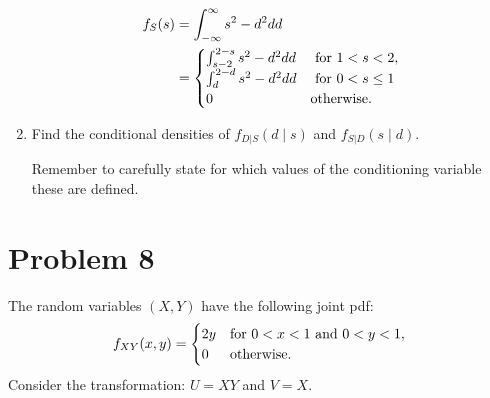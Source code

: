 \documentclass{article}
\newcommand{\1}{\mathbf{1}}
\begin{document}
\begin{enumerate}
    \begin{align*}
    f_{S}(s) &= \int_{-\infty}^\infty s^2 - d^2 dd \\
    &= \begin{cases}
       \int_{s-2}^{2-s} s^2 - d^2 dd &\hbox{ for } 1 < s < 2, \\
       \int_{d}^{2-d} s^2 - d^2 dd  &\hbox{ for } 0 < s\leq 1 \\
       0 &\hbox{otherwise.}
       \end{cases}
    \end{align*}
    
    
    \item Find the conditional densities of $f_{D|S}(d\mid s)$ and $f_{S|D}(s\mid d)$.\par
    Remember to carefully state for which values of the conditioning variable these are defined.
    
    
\end{enumerate}



\newpage
\section*{Problem 8} The random variables $(X,Y)$ have the following joint pdf:
$$f_{XY}(x,y) = \begin{cases}
    2y & \hbox{for } 0 < x < 1 \hbox{ and } 0 < y <1,\\ 
    0 & \hbox{otherwise.}
    \end{cases}
$$
Consider the transformation: $U = XY$ and $ V=X$.
\end{document}
